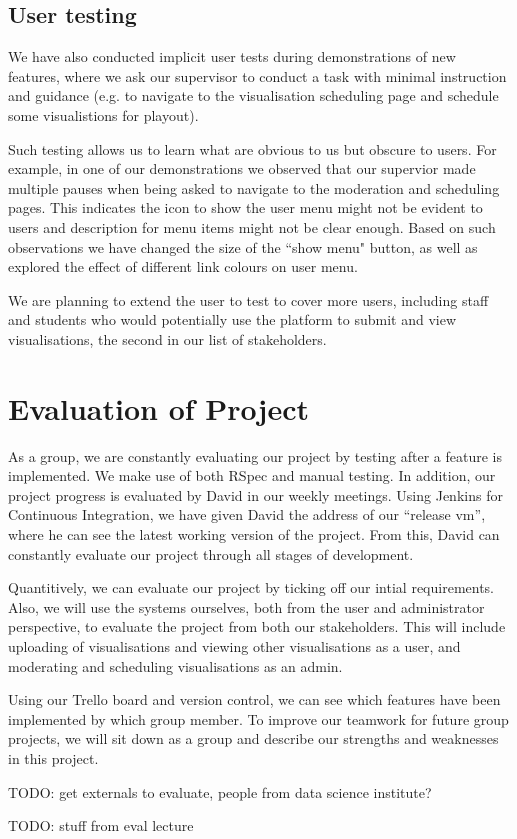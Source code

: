 \documentclass[a4paper]{article}
\begin{document}
\subsection{User testing}
We have also conducted implicit user tests during demonstrations of new features,
where we ask our supervisor to conduct a task with minimal instruction and guidance
(e.g. to navigate to the visualisation scheduling page and schedule some visualistions
for playout).

Such testing allows us to learn what are obvious to us but obscure to users.
For example, in one of our demonstrations we observed that our supervior 
made multiple pauses when
being asked to navigate to the moderation and scheduling pages. This 
indicates the icon to show the user menu might not be evident to users and
description for menu items might not be clear enough. Based on such observations
we have changed the size of the ``show menu" button, as well as explored the effect
of different link colours on user menu.

We are planning to extend the user to test to cover more users, including staff
and students who would potentially use the platform to submit and view visualisations, the second in our list of stakeholders.

\section{Evaluation of Project}
As a group, we are constantly evaluating our project by testing after a 
feature is implemented. We make use of both RSpec and manual testing. In 
addition, our project progress is evaluated by David in our weekly 
meetings. Using Jenkins for Continuous Integration, we have given David
the address of our ``release vm'', where he can see the latest working 
version of the project. From this, David can constantly evaluate our project 
through all stages of development.

Quantitively, we can evaluate our project by ticking off our intial 
requirements. Also, we will use the systems ourselves, both from the user 
and administrator perspective, to evaluate the project from both our stakeholders.
This will include uploading of visualisations and viewing other visualisations as a
user, and moderating and scheduling visualisations as an admin.

Using our Trello board and version control, we can see which features have been 
implemented by which group member. To improve our teamwork for future group 
projects, we will sit down as a group and describe our strengths and weaknesses in 
this project.

TODO: get externals to evaluate, people from data science institute? 

TODO: stuff from eval lecture
\end{document}
